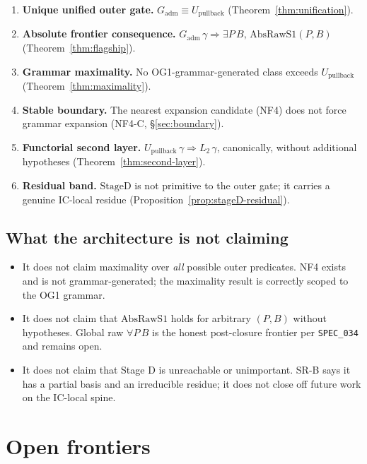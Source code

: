 \documentclass[11pt]{article}
\theoremstyle{plain}
\theoremstyle{definition}
\newcommand{\Gadm}{G_{\mathrm{adm}}}
\newcommand{\Upb}{U_{\mathrm{pullback}}}
\newcommand{\AbsRawSone}{\mathrm{AbsRawS1}}
\newcommand{\Stwo}{L_2}
\newcommand{\StageD}{\mathrm{StageD}}
\newcommand{\lean}[1]{\texttt{\small #1}}
\begin{document}
\begin{enumerate}[label=(\arabic*)]
  \item \textbf{Unique unified outer gate.} $\Gadm \equiv \Upb$
    (Theorem~\ref{thm:unification}).
  \item \textbf{Absolute frontier consequence.}
    $\Gadm\,\gamma \Rightarrow \exists P\,B,\,\AbsRawSone(P,B)$
    (Theorem~\ref{thm:flagship}).
  \item \textbf{Grammar maximality.} No OG1-grammar-generated class exceeds
    $\Upb$ (Theorem~\ref{thm:maximality}).
  \item \textbf{Stable boundary.} The nearest expansion candidate (NF4) does
    not force grammar expansion (NF4-C, \S\ref{sec:boundary}).
  \item \textbf{Functorial second layer.} $\Upb\,\gamma \Rightarrow \Stwo\,\gamma$,
    canonically, without additional hypotheses
    (Theorem~\ref{thm:second-layer}).
  \item \textbf{Residual band.} $\StageD$ is not primitive to the outer gate;
    it carries a genuine IC-local residue (Proposition~\ref{prop:stageD-residual}).
\end{enumerate}

\subsection{What the architecture is not claiming}

\begin{itemize}
  \item It does not claim maximality over \emph{all} possible outer predicates.
    NF4 exists and is not grammar-generated; the maximality result is correctly
    scoped to the OG1 grammar.
  \item It does not claim that $\AbsRawSone$ holds for arbitrary $(P,B)$
    without hypotheses.  Global raw $\forall P\,B$ is the honest post-closure
    frontier per \lean{SPEC\_034} and remains open.
  \item It does not claim that Stage D is unreachable or unimportant.
    SR-B says it has a partial basis and an irreducible residue; it does not
    close off future work on the IC-local spine.
\end{itemize}

\section{Open frontiers}
\label{sec:open}
\end{document}

